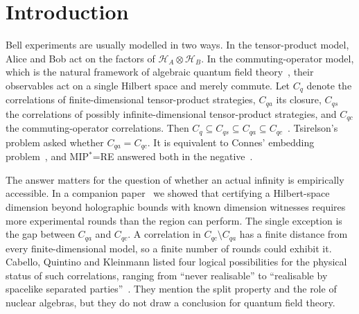 \documentclass[11pt]{article}
\theoremstyle{definition}\newtheorem{definition}{Definition}[section]
\theoremstyle{remark}\newtheorem*{remark}{Remark}
\newcommand{\Hil}{\mathcal H}
\newcommand{\Cqa}{C_{qa}}
\newcommand{\Cqs}{C_{qs}}
\newcommand{\Cqc}{C_{qc}}
\begin{document}
\tableofcontents

\section{Introduction}
\label{sec:intro}

Bell experiments are usually modelled in two ways. In the tensor-product model, Alice and Bob act on the factors of
$\Hil_A\otimes\Hil_B$. In the commuting-operator model, which is the natural framework of algebraic quantum field
theory~\cite{Haag}, their observables act on a single Hilbert space and merely commute. Let $C_q$ denote the
correlations of finite-dimensional tensor-product strategies, $\Cqa$ its closure, $\Cqs$ the correlations of possibly
infinite-dimensional tensor-product strategies, and $\Cqc$ the commuting-operator correlations. Then
$C_q\subseteq\Cqs\subseteq\Cqa\subseteq\Cqc$~\cite{ScholzWerner,Fritz}. Tsirelson's problem asked whether $\Cqa=\Cqc$. It is
equivalent to Connes' embedding problem~\cite{JungeEtAl,Fritz}, and MIP$^*$=RE answered both in the negative~\cite{MIPRE}.

The answer matters for the question of whether an actual infinity is empirically accessible. In a companion
paper~\cite{Chen2026_certify} we showed that certifying a Hilbert-space dimension beyond holographic bounds with known
dimension witnesses requires more experimental rounds than the region can perform. The single exception is the gap
between $\Cqa$ and $\Cqc$. A correlation in $\Cqc\setminus\Cqa$ has a finite distance from every finite-dimensional model, so a
finite number of rounds could exhibit it. Cabello, Quintino and Kleinmann listed four logical possibilities for the
physical status of such correlations, ranging from ``never realisable'' to ``realisable by spacelike separated
parties''~\cite{CabelloQuintinoKleinmann}. They mention the split property and the role of nuclear algebras, but they do
not draw a conclusion for quantum field theory.
\end{document}
